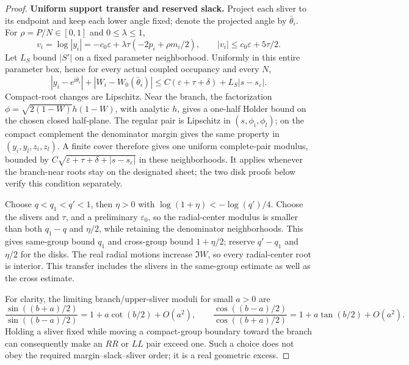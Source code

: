 \documentclass[11pt]{article}
\numberwithin{equation}{section}
\theoremstyle{definition}
\newcommand{\ii}{\mathrm i}
\newcommand{\eps}{\varepsilon}
\begin{document}
\begin{proof}
\par\smallskip\noindent\textbf{Uniform support transfer and reserved slack.}
Project each sliver to its endpoint and keep each lower angle
fixed; denote the projected angle by \(\bar\theta_i\).
For \(\rho=P/N\in[0,1]\) and \(0\le\lambda\le1\),
\[
 v_i=\log|y_i|=-c_0\eps+\lambda\tau(-2p_i+\rho m_i/2),
 \qquad |v_i|\le c_0\eps+5\tau/2.
\]
Let \(L_S\) bound \(|S'|\) on a fixed parameter neighborhood.
Uniformly in this entire parameter box, hence for every actual
coupled occupancy and every \(N\),
\[
 |y_i-e^{\ii\bar\theta_i}|+|W_i-W_0(\bar\theta_i)|
 \le C(\eps+\tau+\delta)+L_S|s-s_\eps|.
\]
Compact-root changes are Lipschitz. Near the branch, the factorization
\(\phi=\sqrt{2(1-W)}h(1-W)\), with analytic \(h\), gives a
one-half Holder bound on the chosen closed half-plane.
The regular pair is Lipschitz in \((s,\phi_i,\phi_l)\);
on the compact complement the denominator margin gives the same
property in \((y_i,y_l,z_i,z_l)\). A finite cover therefore gives
one uniform complete-pair modulus, bounded by
\(C\sqrt{\eps+\tau+\delta+|s-s_\eps|}\) in these neighborhoods.
It applies whenever the branch-near roots stay on the designated
sheet; the two disk proofs below verify this condition separately.

Choose \(q<q_1<q'<1\), then \(\eta>0\) with
\(\log(1+\eta)<-\log(q')/4\).
Choose the slivers and \(\tau\), and a preliminary \(\eps_0\),
so the radial-center modulus is smaller than both \(q_1-q\)
and \(\eta/2\), while retaining the denominator neighborhoods.
This gives same-group bound \(q_1\) and cross-group bound
\(1+\eta/2\); reserve \(q'-q_1\) and \(\eta/2\) for the disks.
The real radial motions increase \(\Im W\), so every radial-center
root is interior. This transfer includes the slivers in the
same-group estimate as well as the cross estimate.

For clarity, the limiting branch/upper-sliver moduli for small
\(a>0\) are
\[
 \frac{\sin((b+a)/2)}{\sin((b-a)/2)}
   =1+a\cot(b/2)+O(a^2),\qquad
 \frac{\cos((b-a)/2)}{\cos((b+a)/2)}
   =1+a\tan(b/2)+O(a^2).
\]
Holding a sliver fixed while moving a compact-group boundary
toward the branch can consequently make an \(RR\) or \(LL\)
pair exceed one. Such a choice does not obey the required
margin--slack--sliver order; it is a real geometric excess.


\end{proof}
\end{document}
